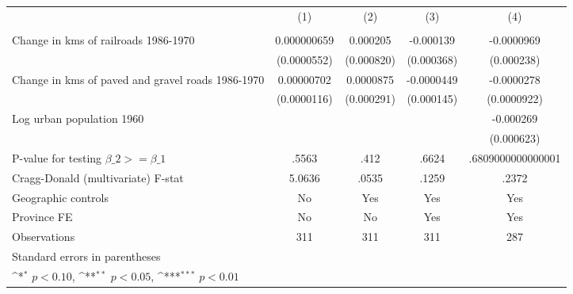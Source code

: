 {
\def\sym#1{\ifmmode^{#1}\else\(^{#1}\)\fi}
\begin{tabular}{l*{4}{c}}
\hline\hline
                &\multicolumn{1}{c}{(1)}&\multicolumn{1}{c}{(2)}&\multicolumn{1}{c}{(3)}&\multicolumn{1}{c}{(4)}\\
                &\multicolumn{1}{c}{}&\multicolumn{1}{c}{}&\multicolumn{1}{c}{}&\multicolumn{1}{c}{}\\
\hline
Change in kms of railroads 1986-1970&0.000000659         & 0.000205         &-0.000139         &-0.0000969         \\
                &(0.0000552)         &(0.000820)         &(0.000368)         &(0.000238)         \\
[1em]
Change in kms of paved and gravel roads 1986-1970&0.00000702         &0.0000875         &-0.0000449         &-0.0000278         \\
                &(0.0000116)         &(0.000291)         &(0.000145)         &(0.0000922)         \\
[1em]
Log urban population 1960&                  &                  &                  &-0.000269         \\
                &                  &                  &                  &(0.000623)         \\
\hline
P-value for testing $\beta\_{2} >= \beta\_{1}$&    .5563         &     .412         &    .6624         &.6809000000000001         \\
Cragg-Donald (multivariate) F-stat&   5.0636         &    .0535         &    .1259         &    .2372         \\
Geographic controls&       No         &      Yes         &      Yes         &      Yes         \\
Province FE     &       No         &       No         &      Yes         &      Yes         \\
Observations    &      311         &      311         &      311         &      287         \\
\hline\hline
\multicolumn{5}{l}{\footnotesize Standard errors in parentheses}\\
\multicolumn{5}{l}{\footnotesize \sym{*} \(p<0.10\), \sym{**} \(p<0.05\), \sym{***} \(p<0.01\)}\\
\end{tabular}
}
